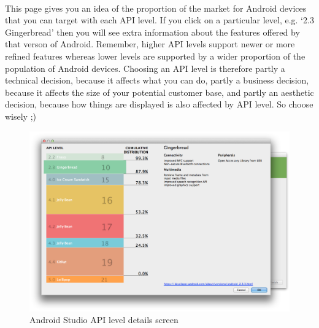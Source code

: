 \paragraph{} This page gives you an idea of the proportion of the market for Android devices that you can target with each API level. If you click on a particular level, e.g. `2.3 Gingerbread' then you will see extra information about the features offered by that verson of Android. Remember, higher API levels support newer or more refined features whereas lower levels are supported by a wider proportion of the population of Android devices. Choosing an API level is therefore partly a technical decision, because it affects what you can do, partly a business decision, because it affects the size of your potential customer base, and partly an aesthetic decision, because how things are displayed is also affected by API level. So choose wisely ;) 

\begin{figure}[H]
\centering
\includegraphics[width=\textwidth]{images/android-studio_05_api-level-details}
\caption{Android Studio API level details screen}
\label{fig:android.studio_apidetails}
\end{figure}

